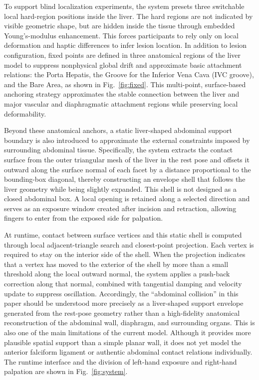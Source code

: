 \documentclass{ieeeaccess}
\begin{document}
To support blind localization experiments, the system presets three switchable local hard-region positions inside the liver. The hard regions are not indicated by visible geometric shape, but are hidden inside the tissue through embedded Young's-modulus enhancement. This forces participants to rely only on local deformation and haptic differences to infer lesion location. In addition to lesion configuration, fixed points are defined in three anatomical regions of the liver model to suppress nonphysical global drift and approximate basic attachment relations: the Porta Hepatis, the Groove for the Inferior Vena Cava (IVC groove), and the Bare Area, as shown in Fig.~\ref{fig:fixed}. This multi-point, surface-based anchoring strategy approximates the stable connection between the liver and major vascular and diaphragmatic attachment regions while preserving local deformability.

Beyond these anatomical anchors, a static liver-shaped abdominal support boundary is also introduced to approximate the external constraints imposed by surrounding abdominal tissue. Specifically, the system extracts the contact surface from the outer triangular mesh of the liver in the rest pose and offsets it outward along the surface normal of each facet by a distance proportional to the bounding-box diagonal, thereby constructing an envelope shell that follows the liver geometry while being slightly expanded. This shell is not designed as a closed abdominal box. A local opening is retained along a selected direction and serves as an exposure window created after incision and retraction, allowing fingers to enter from the exposed side for palpation.

At runtime, contact between surface vertices and this static shell is computed through local adjacent-triangle search and closest-point projection. Each vertex is required to stay on the interior side of the shell. When the projection indicates that a vertex has moved to the exterior of the shell by more than a small threshold along the local outward normal, the system applies a push-back correction along that normal, combined with tangential damping and velocity update to suppress oscillation. Accordingly, the ``abdominal collision'' in this paper should be understood more precisely as a liver-shaped support envelope generated from the rest-pose geometry rather than a high-fidelity anatomical reconstruction of the abdominal wall, diaphragm, and surrounding organs. This is also one of the main limitations of the current model. Although it provides more plausible spatial support than a simple planar wall, it does not yet model the anterior falciform ligament or authentic abdominal contact relations individually. The runtime interface and the division of left-hand exposure and right-hand palpation are shown in Fig.~\ref{fig:system}.
\end{document}
